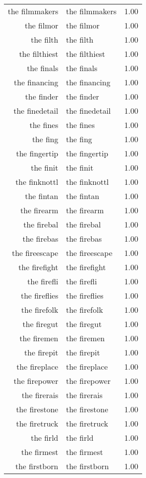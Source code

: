 \begin{table}[ht]
\begin{tabular}{rlr}
  the filmmakers & the filmmakers & 1.00 \\ 
  the filmor & the filmor & 1.00 \\ 
  the filth & the filth & 1.00 \\ 
  the filthiest & the filthiest & 1.00 \\ 
  the finals & the finals & 1.00 \\ 
  the financing & the financing & 1.00 \\ 
  the finder & the finder & 1.00 \\ 
  the finedetail & the finedetail & 1.00 \\ 
  the fines & the fines & 1.00 \\ 
  the fing & the fing & 1.00 \\ 
  the fingertip & the fingertip & 1.00 \\ 
  the finit & the finit & 1.00 \\ 
  the finknottl & the finknottl & 1.00 \\ 
  the fintan & the fintan & 1.00 \\ 
  the firearm & the firearm & 1.00 \\ 
  the firebal & the firebal & 1.00 \\ 
  the firebas & the firebas & 1.00 \\ 
  the fireescape & the fireescape & 1.00 \\ 
  the firefight & the firefight & 1.00 \\ 
  the firefli & the firefli & 1.00 \\ 
  the fireflies & the fireflies & 1.00 \\ 
  the firefolk & the firefolk & 1.00 \\ 
  the firegut & the firegut & 1.00 \\ 
  the firemen & the firemen & 1.00 \\ 
  the firepit & the firepit & 1.00 \\ 
  the fireplace & the fireplace & 1.00 \\ 
  the firepower & the firepower & 1.00 \\ 
  the firerais & the firerais & 1.00 \\ 
  the firestone & the firestone & 1.00 \\ 
  the firetruck & the firetruck & 1.00 \\ 
  the firld & the firld & 1.00 \\ 
  the firmest & the firmest & 1.00 \\ 
  the firstborn & the firstborn & 1.00 \\ 

\end{tabular}
\end{table}
